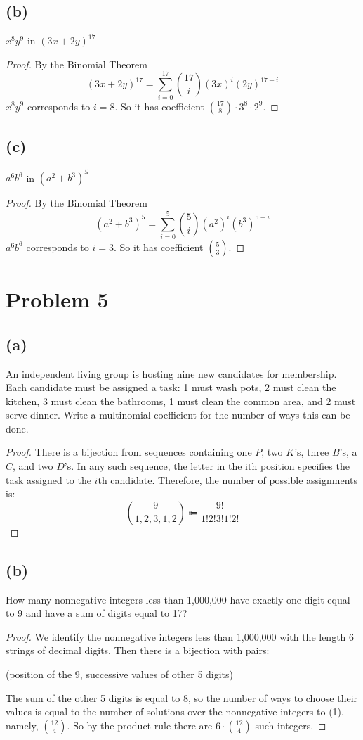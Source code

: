 \documentclass[14pt]{extarticle}
\begin{document}
\subsection{(b)}
$x^8y^9$ in $(3x+2y)^{17}$
\begin{proof}
By the Binomial Theorem 
$$
(3x + 2y)^{17} = \sum_{i = 0}^{17} \binom{17}{i}(3x)^i (2y)^{17-i}
$$ 
$x^8y^9$ corresponds to $i = 8$. So it has coefficient $\binom{17}{8}\cdot 3^8 \cdot 2^9$.
\end{proof}

\subsection{(c)}
$a^6b^6$ in $(a^2+b^3)^5$
\begin{proof}
By the Binomial Theorem 
$$
(a^2 + b^3)^{5} = \sum_{i = 0}^{5} \binom{5}{i}(a^2)^i (b^3)^{5-i}
$$ 
$a^6b^6$ corresponds to $i = 3$. So it has coefficient $\binom{5}{3}$.
\end{proof}

\section{Problem 5}
\subsection{(a)}
An independent living group is hosting nine new candidates for membership. Each candidate must be assigned a task: 1 must wash pots, 2 must clean the kitchen, 3 must clean the bathrooms, 1 must clean the common area, and 2 must serve dinner. Write a multinomial coefficient for the number of ways this can be done.
\begin{proof}
There is a bijection from sequences containing one $P$, two $K$’s, three $B$’s, a $C$, and two $D$’s. In any such sequence, the letter in the ith position specifies the task assigned to the $i$th candidate. Therefore, the number of possible assignments is:
$$
\binom{9}{1,2,3,1,2} \Coloneqq \frac{9!}{1!2!3!1!2!}
$$
\end{proof}

\subsection{(b)}
How many nonnegative integers less than 1,000,000 have exactly one digit equal to 9 and have a sum of digits equal to 17?
\begin{proof}
We identify the nonnegative integers less than 1,000,000 with the length 6 strings of decimal digits. Then there is a bijection with pairs:

\begin{center}
(position of the 9, successive values of other 5 digits)
\end{center}

The sum of the other 5 digits is equal to 8, so the number of ways to choose their values is equal to the number of solutions over the nonnegative integers to (1), namely, $\binom{12}{4}$. So by the product rule there are $6\cdot \binom{12}{4}$ such integers.
\end{proof}
\end{document}
